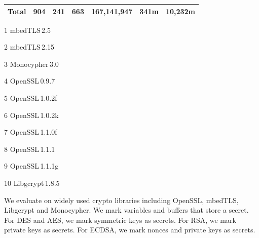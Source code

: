 \begin{table}[]
\begin{threeparttable}
\begin{tabular}{l@{}r@{~~}rrr@{~~}rr}
        Total              & 904                    & 241                 & 663                & 167,141,947      & 341m  & 10,232m     \\\hline
    \end{tabular}
\end{threeparttable}
\begin{tablenotes}
    \scriptsize

    \item[1] mbedTLS\,2.5  ~~~~\item[2] mbedTLS\,2.15 ~\item[3] Monocypher\,3.0 \\
    \item[4] OpenSSL\,0.9.7  ~~\item[5] OpenSSL\,1.0.2f  \item[6] OpenSSL\,1.0.2k \\
    \item[7] OpenSSL\,1.1.0f ~\item[8] OpenSSL\,1.1.1 ~\item[9] OpenSSL\,1.1.1g ~\item[10] Libgcrypt\,1.8.5\\
\end{tablenotes}
\vspace*{-20pt}

\end{table}

We evaluate \tool{} on widely used crypto libraries including OpenSSL, mbedTLS, Libgcrypt and Monocypher\@. 
We mark variables and buffers that store a secret.
For DES and AES, we mark symmetric keys as secrets. 
For RSA, we mark private keys as secrets. For ECDSA, 
we mark nonces and private keys as secrets.

